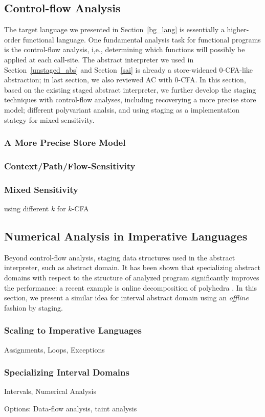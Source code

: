 \subsection{Control-flow Analysis} \label{cfa}

The target language we presented in Section~\ref{bg_lang} is essentially a higher-order functional language.
One fundamental analysis task for functional programs is the control-flow analysis, i,e., determining
which functions will possibly be applied at each call-site. 
The abstract interpreter we used in Section~\ref{unstaged_abs} and Section~\ref{sai} is already 
a store-widened 0-CFA-like abstraction; in last section, we also reviewed AC with 0-CFA.
In this section, based on the existing staged abstract interpreter, we further
develop the staging techniques with control-flow analyses, including recoverying a more precise store model;
different polyvariant analsis, and using staging as a implementation stategy for mixed sensitivity.

\subsubsection{A More Precise Store Model}

\subsubsection{Context/Path/Flow-Sensitivity}

\subsubsection{Mixed Sensitivity}

using different $k$ for $k$-CFA


\subsection{Numerical Analysis in Imperative Languages} \label{cases_imp}

Beyond control-flow analysis, staging data structures used in the abstract interpreter, such as abstract domain.
It has been shown that specializing abstract domains with respect to the structure of analyzed program significantly 
improves the performance: a recent example is online decomposition of polyhedra \cite{DBLP:conf/popl/SinghPV17, Singh:2017:PCD:3177123.3158143}.
In this section, we present a similar idea for interval abstract domain using an \textit{offline} fashion by staging.

\subsubsection{Scaling to Imperative Languages}

Assignments, Loops, Exceptions

\subsubsection{Specializing Interval Domains}

Intervals, Numerical Analysis

Options: Data-flow analysis, taint analysis
